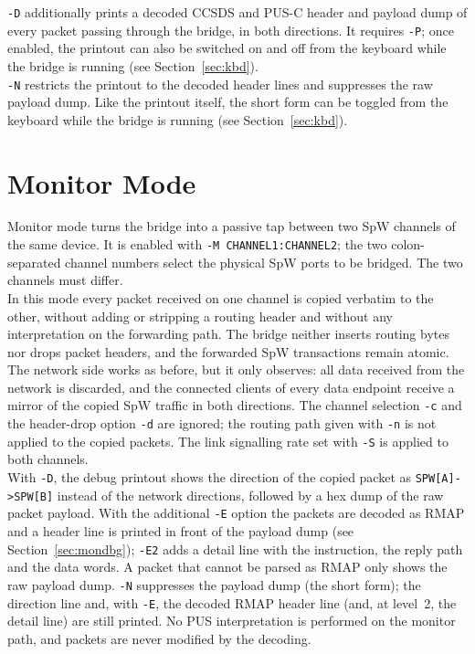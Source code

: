 \noindent
\texttt{-D} additionally prints a decoded CCSDS and PUS-C header and payload
dump of every packet passing through the bridge, in both directions. It
requires \texttt{-P}; once enabled, the printout can also be switched on and
off from the keyboard while the bridge is running (see
Section~\ref{sec:kbd}).
\\
\texttt{-N} restricts the printout to the decoded header lines and suppresses
the raw payload dump. Like the printout itself, the short form can be toggled
from the keyboard while the bridge is running (see Section~\ref{sec:kbd}).

\section{Monitor Mode}
\label{sec:monitor}

Monitor mode turns the bridge into a passive tap between two \gls{SpW}
channels of the same device. It is enabled with
\texttt{-M CHANNEL1:CHANNEL2}; the two colon-separated channel numbers select
the physical \gls{SpW} ports to be bridged. The two channels must differ.
\\
In this mode every packet received on one channel is copied verbatim to the
other, without adding or stripping a routing header and without any
interpretation on the forwarding path. The bridge neither inserts routing
bytes nor drops packet headers, and the forwarded \gls{SpW} transactions
remain atomic. The network side works as before, but it only observes: all
data received from the network is discarded, and the connected clients of
every data endpoint receive a mirror of the copied \gls{SpW} traffic in both
directions. The
channel selection \texttt{-c} and the header-drop option \texttt{-d} are
ignored; the routing path given with \texttt{-n} is not applied to the copied
packets. The link signalling rate set with \texttt{-S} is applied to both
channels.
\\
With \texttt{-D}, the debug printout shows the direction of the copied packet
as \texttt{SPW[A]->SPW[B]} instead of the network directions, followed by a
hex dump of the raw packet payload. With the additional \texttt{-E} option the
packets are decoded as \gls{RMAP} and a header line is printed in front of the
payload dump (see Section~\ref{sec:mondbg}); \texttt{-E2} adds a detail line
with the instruction, the reply path and the data words. A packet that cannot
be parsed as \gls{RMAP} only shows the raw payload dump. \texttt{-N} suppresses
the payload dump (the short form); the direction line and, with \texttt{-E},
the decoded \gls{RMAP} header line (and, at level~2, the detail line) are still
printed. No \gls{PUS} interpretation is performed on the monitor path, and
packets are never modified by the decoding.


